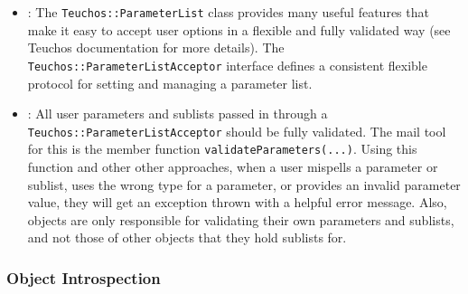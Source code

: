 \begin{itemize}

{}\item\GCGTeuchosParamterListAcceptor: The {}\texttt{Teuchos\-::Parameter\-List}
class provides many useful features that make it easy to accept user options
in a flexible and fully validated way (see Teuchos documentation for more
details).  The {}\texttt{Teuchos\-::Parameter\-List\-Acceptor} interface
defines a consistent flexible protocol for setting and managing a parameter
list.

{}\item\GCGTeuchosParamterListValidation: All user parameters and
sublists passed in through a
{}\texttt{Teuchos\-::Parameter\-List\-Acceptor} should be fully
validated.  The mail tool for this is the member function
{}\texttt{validateParameters(...)}.  Using this function and other
other approaches, when a user mispells a parameter or sublist, uses
the wrong type for a parameter, or provides an invalid parameter
value, they will get an exception thrown with a helpful error message.
Also, objects are only responsible for validating their own parameters
and sublists, and not those of other objects that they hold sublists
for.

\end{itemize}

%
\subsubsection{Object Introspection}
%

